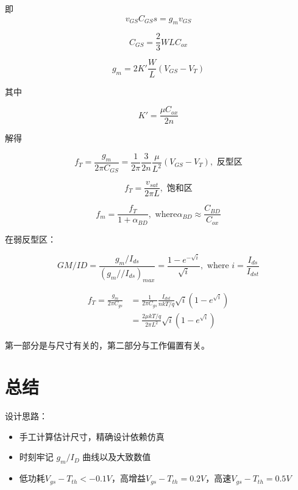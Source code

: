 \documentclass[cn,11pt,chinese,black,simple]{../elegantbook}
\begin{document}
即 \[v_{GS} C_{GS} s = g_m v_{GS}\] 

\[C_{GS} = \frac{2}{3} WL C_{ox}\]

\[g_m = 2 K' \frac{W}{L} (V_{GS} - V_T)\]

其中 

\[K' = \frac{\mu C_{ox}}{2 n}\]


解得

\[f_T = \frac{g_m}{2 \pi C_{GS}} = \frac{1}{2 \pi} \frac{3}{2n} \frac{\mu}{L^2}(V_{GS}-V_T), \text{ 反型区}\] 

\[f_T = \frac{v_{sat}}{2 \pi L}, \text{ 饱和区}\]

\[f_m = \frac{f_T}{1 + \alpha_{BD} } ,\text{ where} \alpha_{BD} \approx \frac{C_{BD}}{C_{ox}}\]

在弱反型区：

\[GM/ID = \frac{g_m/I_{ds}}{(g_m // I_{ds})_{max}} = \frac{1 - e^{-\sqrt{i}}}{\sqrt{i}}, \text{ where } i = \frac{I_{ds}}{I_{dst}}\]


\[\begin{aligned}
    f_T = \frac{g_m}{2 \pi C_{gs}} &= \frac{1}{2 \pi C_{gs}} \frac{I_{dst}}{nkT/q}\sqrt{i}(1-e^{\sqrt{i}})\\
    &= \frac{2 \mu kT/q}{2 \pi L^2} \sqrt{i} (1 - e^{\sqrt{i}})
\end{aligned}\]

第一部分是与尺寸有关的，第二部分与工作偏置有关。


\section{总结}

设计思路：

\begin{itemize}
    \item 手工计算估计尺寸，精确设计依赖仿真
    \item 时刻牢记 \(g_m/I_D\) 曲线以及大致数值
    \item 低功耗\(V_{gs}-T_{th} < -0.1 V\)，高增益\(V_{gs}-T_{th} = 0.2 V\)，高速\(V_{gs}-T_{th} = 0.5 V\)
\end{itemize}


\let\chapname\undefined
\ifx\mainclass\undefined
\end{document}
